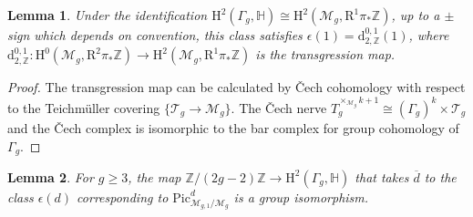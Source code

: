 \documentclass[12pt]{amsart}
\newtheorem{lemma}{Lemma}
\begin{document}
\begin{lemma}\label{identify}Under the identification $\mathrm{H}^2(\Gamma_g,\mathbb{H})\cong\mathrm{H}^2(\mathcal{M}_g,\mathrm{R}^1\pi_*\mathbb{Z})$, up to a $\pm$ sign which depends on convention, this class satisfies $\epsilon(1)=\mathrm{d}_{2,\mathbb{Z}}^{0,1}(1)$, where $\mathrm{d}_{2,\mathbb{Z}}^{0,1}\colon\mathrm{H}^0(\mathcal{M}_g,\mathrm{R}^2\pi_*\mathbb{Z})\to\mathrm{H}^2(\mathcal{M}_g,\mathrm{R}^1\pi_*\mathbb{Z})$ is the transgression map.
\end{lemma}
\begin{proof}The transgression map can be calculated by \v{C}ech cohomology with respect to the Teichm\"uller covering $\{\mathcal{T}_{g}\to\mathcal{M}_{g}\}$. The \v{C}ech nerve $T_{g}^{\times_{\mathcal{M}_g}k+1}\cong(\Gamma_g)^k\times\mathcal{T}_g$ and the \v{C}ech complex is isomorphic to the bar complex for group cohomology of $\Gamma_g$.
\end{proof}

\begin{lemma}{\cite[Theorem 24]{zbMATH01590471}}\label{Hain-lemma} For $g\geq3$, the map $\mathbb{Z}/(2g-2)\mathbb{Z}\to\mathrm{H}^2(\Gamma_g,\mathbb{H})$ that takes $\overline{d}$ to the class $\epsilon(d)$ corresponding to $\mathrm{Pic}^d_{\mathcal{M}_{g,1}/\mathcal{M}_g}$ is a group isomorphism.
\end{lemma}
\end{document}
